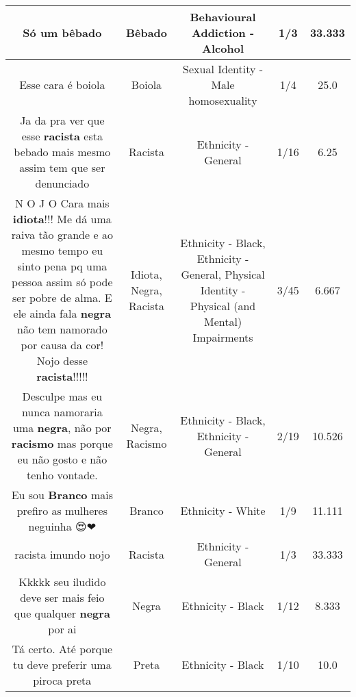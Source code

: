 \documentclass[11pt]{article}
\newlength\mylength
\begin{document}
\begin{center}
\begin{longtable}{|C{.65\mylength}|C{.30\mylength}|C{.12\mylength}|C{.12\mylength}|C{.12\mylength}|}
  \small Só um bêbado\normalsize   & Bêbado & Behavioural Addiction - Alcohol & 1/3 & 33.333 \\  \hline
  \small Esse cara é boiola\normalsize   & Boiola & Sexual Identity - Male homosexuality & 1/4 & 25.0 \\  \hline
  \small Ja da pra ver que esse \textbf{racista} esta bebado mais mesmo assim tem que ser denunciado\normalsize   & Racista & Ethnicity - General & 1/16 & 6.25 \\  \hline
  \small N O J O Cara mais \textbf{idiota}!!! Me dá uma raiva tão grande e ao mesmo tempo eu sinto pena pq uma pessoa assim só pode ser pobre de alma. E ele ainda fala \textbf{negra} não tem namorado por causa da cor! Nojo desse \textbf{racista}!!!!!\normalsize   & Idiota, Negra, Racista & Ethnicity - Black, Ethnicity - General, Physical Identity - Physical (and Mental) Impairments & 3/45 & 6.667 \\  \hline
  \small Desculpe mas eu nunca namoraria uma \textbf{negra}, não por \textbf{racismo} mas porque eu não gosto e não tenho vontade.\normalsize   & Negra, Racismo & Ethnicity - Black, Ethnicity - General & 2/19 & 10.526 \\  \hline
  \small Eu sou \textbf{Branco} mais prefiro as mulheres neguinha 😍❤\normalsize   & Branco & Ethnicity - White & 1/9 & 11.111 \\  \hline
  \small racista imundo nojo\normalsize   & Racista & Ethnicity - General & 1/3 & 33.333 \\  \hline
  \small Kkkkk seu iludido deve ser mais feio que qualquer \textbf{negra} por ai\normalsize   & Negra & Ethnicity - Black & 1/12 & 8.333 \\  \hline
  \small Tá certo. Até porque tu deve preferir uma piroca preta\normalsize   & Preta & Ethnicity - Black & 1/10 & 10.0 \\  \hline

\end{longtable}
\end{center}
\end{document}

